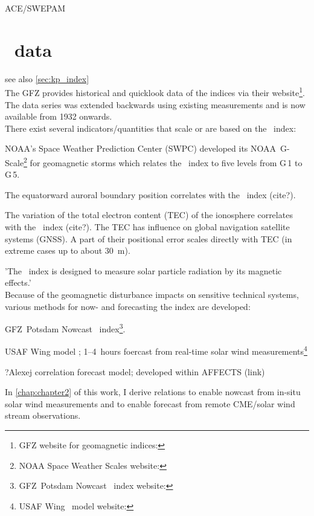 ACE/SWEPAM\\	%


\section{\Kp{}~data}
\label{sec:kp_data}

see also \ref{sec:kp_index}\\

The GFZ provides historical and quicklook data of the indices via their website\footnote{GFZ website for geomagnetic indices: }.\\

The data series was extended backwards using existing measurements and is now available from 1932 onwards.\\

There exist several indicators/quantities that scale or are based on the \Kp{}~index:
\begin{itemize*}
	\item NOAA's Space Weather Prediction Center (SWPC) developed its NOAA~G-Scale\footnote{NOAA Space Weather Scales website: } for geomagnetic storms which relates the \Kp~index to five levels from G\,1 to G\,5.
	\item The equatorward auroral boundary position correlates with the \Kp~index (cite?).
	\item The variation of the total electron content (TEC) of the ionosphere correlates with the \Kp~index (cite?). The TEC has influence on global navigation satellite systems (GNSS). A part of their positional error scales directly with TEC (in extreme cases up to about \SI{30}{\m}).
\end{itemize*}


'The \Kp{}~index is designed to measure solar particle radiation by its magnetic effects.'\\

Because of the geomagnetic disturbance impacts on sensitive technical systems, various methods for now- and forecasting the \Kp{} index are developed:
\begin{itemize*}
	\item GFZ~Potsdam Nowcast \Kp~index\footnote{GFZ~Potsdam Nowcast \Kp~index website: }.
	\item USAF Wing \Kp{} model \citep{Wing2005}; 1--4~hours foercast from real-time solar wind measurements\footnote{USAF Wing \Kp~model website: }
	\item ?Alexej \Kp{} correlation forecast model; developed within AFFECTS (link)
	\item In \autoref{chap:chapter2} of this work, I derive relations to enable \Kp{} nowcast from in-situ solar wind measurements and to enable \Kp{} forecast from remote CME/solar wind stream observations.
\end{itemize*}


